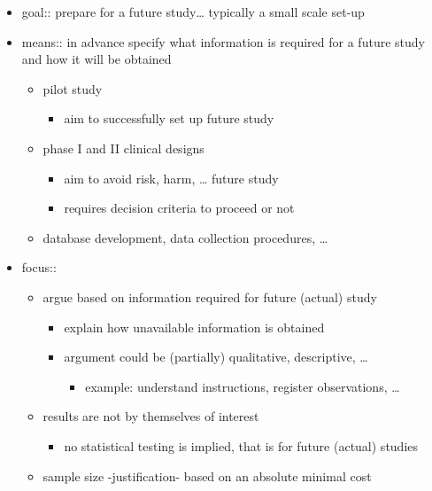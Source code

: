 \documentclass[
]{article}
\providecommand{\tightlist}{%
  \setlength{\itemsep}{0pt}\setlength{\parskip}{0pt}}
\begin{document}
\begin{itemize}
\tightlist
\item
  goal:: prepare for a future study\ldots{} typically a small scale
  set-up
\item
  means:: in advance specify what information is required for a future
  study and how it will be obtained

  \begin{itemize}
  \tightlist
  \item
    pilot study

    \begin{itemize}
    \tightlist
    \item
      aim to successfully set up future study
    \end{itemize}
  \item
    phase I and II clinical designs

    \begin{itemize}
    \tightlist
    \item
      aim to avoid risk, harm, \ldots{} future study
    \item
      requires decision criteria to proceed or not
    \end{itemize}
  \item
    database development, data collection procedures, \ldots{} \\
  \end{itemize}
\item
  focus::

  \begin{itemize}
  \tightlist
  \item
    argue based on information required for future (actual) study

    \begin{itemize}
    \tightlist
    \item
      explain how unavailable information is obtained
    \item
      argument could be (partially) qualitative, descriptive, \ldots{}

      \begin{itemize}
      \tightlist
      \item
        example: understand instructions, register observations,
        \ldots{}
      \end{itemize}
    \end{itemize}
  \item
    results are not by themselves of interest

    \begin{itemize}
    \tightlist
    \item
      no statistical testing is implied, that is for future (actual)
      studies
    \end{itemize}
  \item
    sample size -justification- based on an absolute minimal cost


\end{itemize}
\end{itemize}
\end{document}
